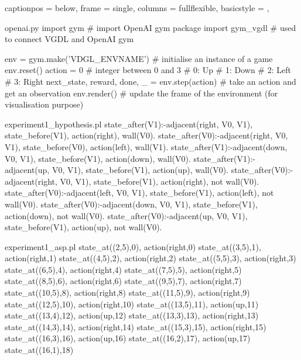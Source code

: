 \lstset
{
  captionpos = below,
  frame      = single,
  columns    = fullflexible,
  basicstyle = \ttfamily,
}

\begin{filecontents*}{openai.py}
  import gym # import OpenAI gym package
  import gym_vgdl # used to connect VGDL and OpenAI gym

  env = gym.make('VDGL_ENVNAME') # initialise an instance of a game
  env.reset()
  action = 0 # integer between 0 and 3
  # 0: Up
  # 1: Down
  # 2: Left
  # 3: Right
  next_state, reward, done, _ = env.step(action) # take an action and get an observation
  env.render() # update the frame of the environment (for visualisation purpose)
\end{filecontents*}
  

\begin{filecontents*}{experiment1_hypothesis.pl}
state_after(V1):-adjacent(right, V0, V1), state_before(V1), 
                   action(right), wall(V0).
state_after(V0):-adjacent(right, V0, V1), state_before(V0), 
                   action(left), wall(V1).
state_after(V1):-adjacent(down, V0, V1), state_before(V1), 
                   action(down), wall(V0).
state_after(V1):-adjacent(up, V0, V1), state_before(V1), 
                   action(up), wall(V0).
state_after(V0):-adjacent(right, V0, V1), state_before(V1), 
                   action(right), not wall(V0).
state_after(V0):-adjacent(left, V0, V1), state_before(V1), 
                   action(left), not wall(V0).
state_after(V0):-adjacent(down, V0, V1), state_before(V1), 
                   action(down), not wall(V0).
state_after(V0):-adjacent(up, V0, V1), state_before(V1), 
                   action(up), not wall(V0).
\end{filecontents*}

\begin{filecontents*}{experiment1_asp.pl}
state_at((2,5),0), action(right,0)
state_at((3,5),1), action(right,1)
state_at((4,5),2), action(right,2)
state_at((5,5),3), action(right,3)
state_at((6,5),4), action(right,4)
state_at((7,5),5), action(right,5)
state_at((8,5),6), action(right,6)
state_at((9,5),7), action(right,7)
state_at((10,5),8), action(right,8)
state_at((11,5),9), action(right,9)
state_at((12,5),10), action(right,10)
state_at((13,5),11), action(up,11)
state_at((13,4),12), action(up,12)
state_at((13,3),13), action(right,13)
state_at((14,3),14), action(right,14)
state_at((15,3),15), action(right,15)
state_at((16,3),16), action(up,16)
state_at((16,2),17), action(up,17)
state_at((16,1),18)
\end{filecontents*}

